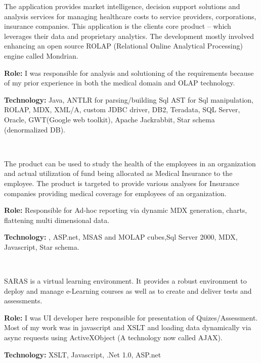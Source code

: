 \begin{resume}
\begin{position}
The application provides market intelligence, decision support solutions and analysis services for managing healthcare costs to service providers, corporations, insurance companies. This application is the clients core product – which leverages their data and proprietary analytics. The 
development mostly involved enhancing an open source ROLAP (Relational Online Analytical Processing) engine called Mondrian. 

{\textbf{Role:}} I was responsible for analysis and solutioning of the requirements because of my prior experience in both the medical domain and OLAP technology. 

{\textbf{Technology:}} Java, ANTLR for parsing/building Sql AST for Sql manipulation, ROLAP, MDX, XML/A, custom JDBC driver, DB2, Teradata, SQL Server, Oracle, GWT(Google web toolkit), Apache Jackrabbit, Star schema (denormalized DB).
\end{position}\\

\begin{position}
The product can be used to study the health of the employees in an organization and actual utilization of fund being allocated as Medical Insurance to the employee. The product is targeted to provide various analyses for Insurance companies providing medical coverage for employees of an organization.

{\textbf{Role:}} Responsible for Ad-hoc reporting via dynamic MDX generation, charts, flattening multi dimensional data.

{\textbf{Technology:}} \CSharp, ASP.net, MSAS and MOLAP cubes,Sql Server 2000, MDX, Javascript, Star schema.
\end{position}\\

\begin{position}
SARAS is a virtual learning environment. It provides a robust environment to deploy and manage e-Learning courses as well as to create and deliver tests and assessments.

{\textbf{Role:}} I was UI developer here responsible for presentation of Quizes/Assessment. Most of my work was in javascript and XSLT and loading data dynamically via async requests using ActiveXObject (A technology now called AJAX).

{\textbf{Technology:}} XSLT, Javascript, .Net 1.0, ASP.net
\end{position}\\




\end{resume}

